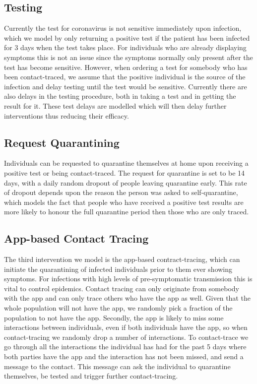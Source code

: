 \documentclass[12pt, oneside]{amsart}   	%
\begin{document}
\subsection{Testing} Currently the test for coronavirus is not sensitive immediately upon infection, which we model by only returning a positive test if the patient has been infected for 3 days when the test takes place. 
For individuals who are already displaying symptoms this is not an issue since the symptoms normally only present after the test has become sensitive. 
However, when ordering a test for somebody who has been contact-traced, we assume that the positive individual is the source of the infection and delay testing until the test would be sensitive. Currently there are also delays in the testing procedure, both in taking a test and in getting the result for it. 
These test delays are modelled which will then delay further interventions thus reducing their efficacy.

\subsection{Request Quarantining} 
Individuals can be requested to quarantine themselves at home upon receiving a positive test or being contact-traced. 
The request for quarantine is set to be 14 days, with a daily random dropout of people leaving quarantine early. 
This rate of dropout depends upon the reason the person was asked to self-quarantine, which models the fact that people who have received a positive test results are more likely to honour the full quarantine period then those who are only traced.

\subsection{App-based Contact Tracing} 
The third intervention we model is the app-based contract-tracing, which can initiate the quarantining of infected individuals prior to them ever showing symptoms. 
For infections with high levels of pre-symptomatic transmission this is vital to control epidemics. 
Contact tracing can only originate from somebody with the app and can only trace others who have the app as well. 
Given that the whole population will not have the app, we randomly pick a fraction of the population to not have the app. 
Secondly, the app is likely to miss some interactions between individuals, even if both individuals have the app, so when contact-tracing we randomly drop a number of interactions. 
To contact-trace we go through all the interactions the individual has had for the past 5 days where both parties have the app and the interaction has not been missed, and send a message to the contact.
This message can ask the individual to quarantine themselves, be tested and trigger further contact-tracing.
\medskip
\end{document}
